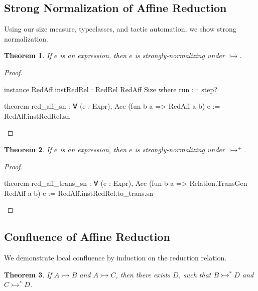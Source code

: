 \documentclass{article}
\newtheorem{theorem}{Theorem}
\newcommand{\affarr}{\rightarrowtail}
\begin{document}
\subsection{Strong Normalization of Affine Reduction}

Using our size measure, typeclasses, and tactic automation, we show strong normalization.

\begin{theorem}
  If \(e\) is an expression, then \(e\) is strongly-normalizing under \(\affarr\).
\end{theorem}

\begin{proof}
\begin{leancode}


instance RedAff.instRedRel : RedRel RedAff Size where
  run := step?

theorem red_aff_sn : ∀ (e : Expr), Acc (fun b a => RedAff a b) e :=
  RedAff.instRedRel.sn
\end{leancode}
\end{proof}

\begin{theorem}
  If \(e\) is an expression, then \(e\) is strongly-normalizing under \(\affarr^{+}\).
\end{theorem}

\begin{proof}
\begin{leancode}


theorem red_aff_trans_sn : ∀ (e : Expr), Acc
  (fun b a => Relation.TransGen RedAff a b) e :=
  RedAff.instRedRel.to_trans.sn
\end{leancode}
\end{proof}

\subsection{Confluence of Affine Reduction}

We demonstrate local confluence by induction on the reduction relation.

\begin{theorem}
  If \(A \affarr B\) and \(A \affarr C\), then there exists \(D\), such that \(B \affarr^{*} D\) and \(C \affarr^{*} D\).
\end{theorem}
\end{document}
